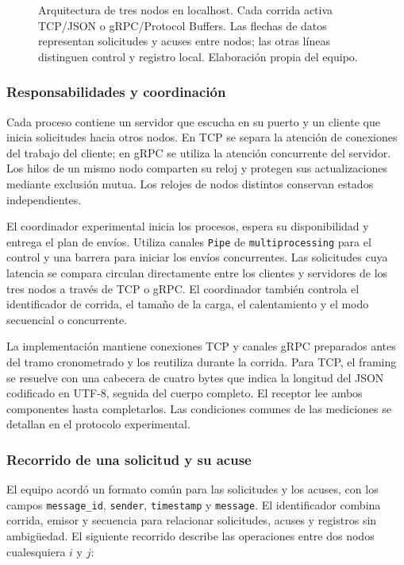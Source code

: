 \begin{figure}[p]
    \centering
    
    \caption{Arquitectura de tres nodos en localhost. Cada corrida activa
    TCP/JSON o gRPC/Protocol Buffers. Las flechas de datos representan solicitudes
    y acuses entre nodos; las otras líneas distinguen control y registro local.
    Elaboración propia del equipo.}
    \label{fig:arquitectura-tres-nodos}
\end{figure}
\clearpage

\subsubsection{Responsabilidades y coordinación}

Cada proceso contiene un servidor que escucha en su puerto y un cliente que
inicia solicitudes hacia otros nodos. En TCP se separa la atención de conexiones
del trabajo del cliente; en gRPC se utiliza la atención concurrente del servidor.
Los hilos de un mismo nodo comparten su reloj y protegen sus actualizaciones
mediante exclusión mutua. Los relojes de nodos distintos conservan estados
independientes.

El coordinador experimental inicia los procesos, espera su disponibilidad y
entrega el plan de envíos. Utiliza canales \texttt{Pipe} de
\texttt{multiprocessing} para el control y una barrera para iniciar los envíos
concurrentes. Las solicitudes cuya latencia se compara circulan directamente
entre los clientes y servidores de los tres nodos a través de TCP o gRPC.
El coordinador también controla el
identificador de corrida, el tamaño de la carga, el calentamiento y el modo
secuencial o concurrente.

La implementación mantiene conexiones TCP y canales gRPC preparados antes del
tramo cronometrado y los reutiliza durante la corrida. Para TCP, el framing se
resuelve con una cabecera de cuatro bytes que indica la longitud del JSON
codificado en UTF-8, seguida del cuerpo completo. El receptor lee ambos
componentes hasta completarlos. Las condiciones comunes de las mediciones
se detallan en el protocolo experimental.

\subsubsection{Recorrido de una solicitud y su acuse}

El equipo acordó un formato común para las solicitudes y los acuses, con los
campos \texttt{message\_id}, \texttt{sender}, \texttt{timestamp} y
\texttt{message}. El identificador combina corrida, emisor y secuencia para relacionar
solicitudes, acuses y registros sin ambigüedad. El siguiente recorrido describe las
operaciones entre dos nodos cualesquiera $i$ y $j$:

